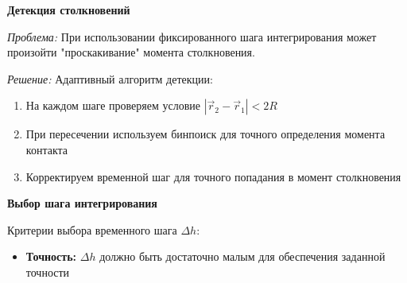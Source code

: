 \begin{center}
    \textbf{Детекция столкновений}
\end{center}

\textit{Проблема:} При использовании фиксированного шага интегрирования может произойти "проскакивание"  момента столкновения.

\textit{Решение:} Адаптивный алгоритм детекции:
\begin{enumerate}
    \item На каждом шаге проверяем условие $|\vec{r}_2 - \vec{r}_1| < 2R$
    \item При пересечении используем бинпоиск для точного определения момента контакта
    \item Корректируем временной шаг для точного попадания в момент столкновения
\end{enumerate}

\begin{center}
    \textbf{Выбор шага интегрирования}
\end{center}

Критерии выбора временного шага $\Delta h$:
\begin{itemize}
    \item \textbf{Точность:} $\Delta h$ должно быть достаточно малым для обеспечения заданной точности
\end{itemize}

\newpage